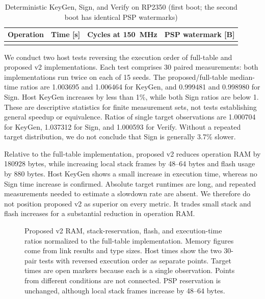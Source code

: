 \documentclass[a4paper,10pt]{article}
\theoremstyle{definition}
\theoremstyle{remark}
\begin{document}
\begin{table}[H]
  \centering
  \caption{Deterministic KeyGen, Sign, and Verify on RP2350 (first boot; the second boot has identical PSP watermarks)}
  \label{tab:target-runtime}
  \small
  \begin{tabular}{@{}lrrr@{}}
    \toprule
    Operation & Time [s] & Cycles at \SI{150}{\mega\hertz} & PSP watermark [B] \\
    \midrule
    \\
    \bottomrule
  \end{tabular}
\end{table}

We conduct two host tests reversing the execution order of full-table and proposed v2 implementations. Each test comprises 30 paired measurements: both implementations run twice on each of 15 seeds. The proposed/full-table median-time ratios are \num{1.003695} and \num{1.006464} for KeyGen, and \num{0.999481} and \num{0.998980} for Sign. Host KeyGen increases by less than 1\%, while both Sign ratios are below 1. These are descriptive statistics for finite measurement sets, not tests establishing general speedup or equivalence. Ratios of single target observations are \num{1.000704} for KeyGen, \num{1.037312} for Sign, and \num{1.000593} for Verify. Without a repeated target distribution, we do not conclude that Sign is generally \num{3.7}\% slower.

Relative to the full-table implementation, proposed v2 reduces operation RAM by \num{180928} bytes, while increasing local stack frames by 48--64 bytes and flash usage by \num{880} bytes. Host KeyGen shows a small increase in execution time, whereas no Sign time increase is confirmed. Absolute target runtimes are long, and repeated measurements needed to estimate a slowdown rate are absent. We therefore do not position proposed v2 as superior on every metric. It trades small stack and flash increases for a substantial reduction in operation RAM.

\begin{figure}[H]
  \centering
  
  \caption{Proposed v2 RAM, stack-reservation, flash, and execution-time ratios normalized to the full-table implementation. Memory figures come from link results and type sizes. Host times show the two 30-pair tests with reversed execution order as separate points. Target times are open markers because each is a single observation. Points from different conditions are not connected. PSP reservation is unchanged, although local stack frames increase by 48--64 bytes.}
  \label{fig:tradeoff}
\end{figure}
\end{document}
